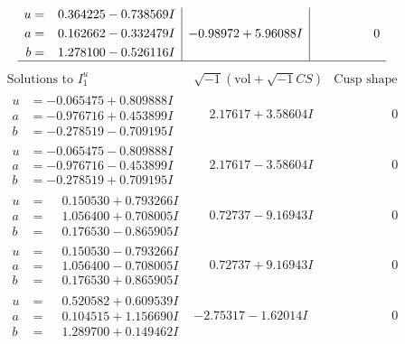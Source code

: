 \documentclass[1p]{elsarticle_modified}
\theoremstyle{definition}
\newcommand{\I}{\sqrt{-1}}
\begin{document}
$$\begin{array}{c|c|c}
\begin{aligned}
u &= \phantom{-}0.364225 - 0.738569 I \\
a &= \phantom{-}0.162662 - 0.332479 I \\
b &= \phantom{-}1.278100 - 0.526116 I\end{aligned}
 & -0.98972 + 5.96088 I & \phantom{-0.000000 } 0\\
 \hline 
 \end{array}$$\newpage$$\begin{array}{c|c|c}  
\text{Solutions to }I^u_{1}& \I (\text{vol} + \sqrt{-1}CS) & \text{Cusp shape}\\
 \hline 
\begin{aligned}
u &= -0.065475 + 0.809888 I \\
a &= -0.976716 + 0.453899 I \\
b &= -0.278519 - 0.709195 I\end{aligned}
 & \phantom{-}2.17617 + 3.58604 I & \phantom{-0.000000 } 0 \\ \hline\begin{aligned}
u &= -0.065475 - 0.809888 I \\
a &= -0.976716 - 0.453899 I \\
b &= -0.278519 + 0.709195 I\end{aligned}
 & \phantom{-}2.17617 - 3.58604 I & \phantom{-0.000000 } 0 \\ \hline\begin{aligned}
u &= \phantom{-}0.150530 + 0.793266 I \\
a &= \phantom{-}1.056400 + 0.708005 I \\
b &= \phantom{-}0.176530 - 0.865905 I\end{aligned}
 & \phantom{-}0.72737 - 9.16943 I & \phantom{-0.000000 } 0 \\ \hline\begin{aligned}
u &= \phantom{-}0.150530 - 0.793266 I \\
a &= \phantom{-}1.056400 - 0.708005 I \\
b &= \phantom{-}0.176530 + 0.865905 I\end{aligned}
 & \phantom{-}0.72737 + 9.16943 I & \phantom{-0.000000 } 0 \\ \hline\begin{aligned}
u &= \phantom{-}0.520582 + 0.609539 I \\
a &= \phantom{-}0.104515 + 1.156690 I \\
b &= \phantom{-}1.289700 + 0.149462 I\end{aligned}
 & -2.75317 - 1.62014 I & \phantom{-0.000000 } 0 \\ \hline\begin{aligned}

\end{aligned}
\end{array}$$
\end{document}
